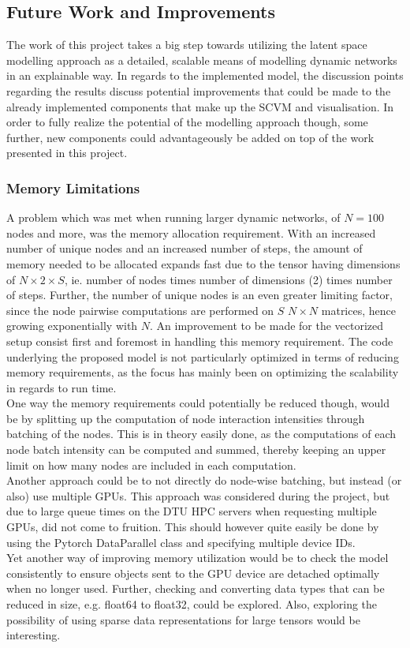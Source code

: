 \subsection{Future Work and Improvements}
\label{sec:Discussion:FutureWork}
The work of this project takes a big step towards utilizing the latent space modelling approach as a detailed, scalable means of modelling dynamic networks in an explainable way.
In regards to the implemented model, the discussion points regarding the results discuss potential improvements that could be made to the already implemented components that make up the SCVM and visualisation. 
In order to fully realize the potential of the modelling approach though, some further, new components could advantageously be added on top of the work presented in this project.


\subsubsection{Memory Limitations}
\label{sec:Discussion:FutureWork:MemoryLimitations}
A problem which was met when running larger dynamic networks, of $N = 100$ nodes and more, was the memory allocation requirement.
With an increased number of unique nodes and an increased number of steps, the amount of memory needed to be allocated expands fast due to the tensor having dimensions of $N \times 2 \times S$, ie. number of nodes times number of dimensions (2) times number of steps. 
Further, the number of unique nodes is an even greater limiting factor, since the node pairwise computations are performed on $S$ $N \times N$ matrices, hence growing exponentially with $N$.
An improvement to be made for the vectorized setup consist first and foremost in handling this memory requirement. 
The code underlying the proposed model is not particularly optimized in terms of reducing memory requirements, as the focus has mainly been on optimizing the scalability in regards to run time. 
\\
One way the memory requirements could potentially be  reduced though, would be by splitting up the computation of node interaction intensities through batching of the nodes. 
This is in theory easily done, as the computations of each node batch intensity can be computed and summed, thereby keeping an upper limit on how many nodes are included in each computation. 
\\
Another approach could be to not directly do node-wise batching, but instead (or also) use multiple GPUs. 
This approach was considered during the project, but due to large queue times on the DTU HPC servers when requesting multiple GPUs, did not come to fruition. 
This should however quite easily be done by using the Pytorch DataParallel \cite{DataParallelDocumentation} class and specifying multiple device IDs. 
\\
Yet another way of improving memory utilization would be to check the model consistently to ensure objects sent to the GPU device are detached optimally when no longer used.
Further, checking and converting data types that can be reduced in size, e.g. float64 to float32, could be explored.
Also, exploring the possibility of using sparse data representations \cite{Torch.sparseDocumentation} for large tensors would be interesting.


